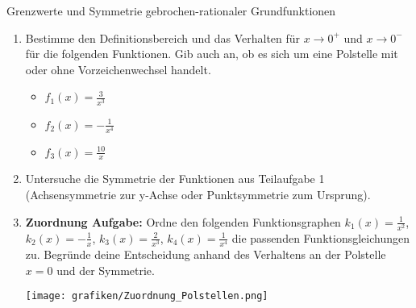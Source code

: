 \begin{aufgabenumgebung}{Grenzwerte und Symmetrie gebrochen-rationaler Grundfunktionen}
\begin{enumerate}
    \item Bestimme den Definitionsbereich und das Verhalten für $x \to 0^+$ und $x \to 0^-$ für die folgenden Funktionen. Gib auch an, ob es sich um eine Polstelle mit oder ohne Vorzeichenwechsel handelt.
        \begin{itemize}
            \item $f_1(x) = \frac{3}{x^3}$
            \item $f_2(x) = -\frac{1}{x^4}$
            \item $f_3(x) = \frac{10}{x}$
        \end{itemize}
    \item Untersuche die Symmetrie der Funktionen aus Teilaufgabe 1 (Achsensymmetrie zur y-Achse oder Punktsymmetrie zum Ursprung).
    \item \textbf{Zuordnung Aufgabe:} Ordne den folgenden Funktionsgraphen $k_1(x) = \frac{1}{x^2}$, $k_2(x) = -\frac{1}{x}$, $k_3(x) = \frac{2}{x^3}$, $k_4(x) = \frac{1}{x^4}$ die passenden Funktionsgleichungen zu. Begründe deine Entscheidung anhand des Verhaltens an der Polstelle $x=0$ und der Symmetrie.
    \begin{center}
        \texttt{[image: grafiken/Zuordnung\_Polstellen.png]}
        \label{fig:zuordnung_polstellen}
    \end{center}
\end{enumerate}
\end{aufgabenumgebung}

